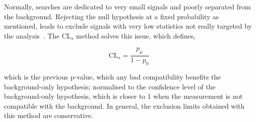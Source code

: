 Normally, searches are dedicated to very small signals and poorly separated from the background. Rejecting the null hypothesis at a fixed probability as mentioned, leads to exclude signals with very low statistics not really targeted by the analysis~\cite{JUNK1999435}. The CL$_{s}$ method solves this issue, which defines,

\begin{equation}
    \text{CL}_{s}=\frac{p_\mu}{1-p_0}
\end{equation}

which is the previous p-value, which any bad compatibility benefits the background-only hypothesis; normalised to the confidence level of the background-only hypothesis, which is closer to 1 when the measurement is not compatible with the background. In general, the exclusion limits obtained with this method are conservative.

